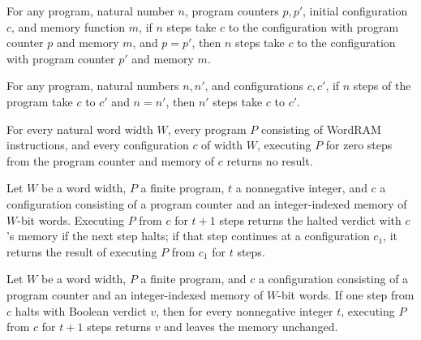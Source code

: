 \begin{theorem}
\label{WordRAM.Steps.cast_pos}
\leanok
{}
For any program, natural number $n$, program counters $p,p'$, initial configuration $c$,
and memory function $m$, if $n$ steps take $c$ to the configuration with program counter
$p$ and memory $m$, and $p=p'$, then $n$ steps take $c$ to the configuration with
program counter $p'$ and memory $m$.
\end{theorem}

\begin{theorem}
\label{WordRAM.Steps.cast_count}
\leanok
{}
For any program, natural numbers $n,n'$, and configurations $c,c'$, if $n$ steps of the
program take $c$ to $c'$ and $n=n'$, then $n'$ steps take $c$ to $c'$.
\end{theorem}

\begin{theorem}
\label{WordRAM.exec_zero}
\leanok
{}
For every natural word width $W$, every program $P$ consisting of WordRAM instructions,
and every configuration $c$ of width $W$, executing $P$ for zero steps from the program
counter and memory of $c$ returns no result.
\end{theorem}

\begin{theorem}
\label{WordRAM.exec_succ}
\leanok
{}
Let $W$ be a word width, $P$ a finite program, $t$ a nonnegative integer, and $c$ a
configuration consisting of a program counter and an integer-indexed memory of $W$-bit
words. Executing $P$ from $c$ for $t+1$ steps returns the halted verdict with $c$'s
memory if the next step halts; if that step continues at a configuration $c_1$, it
returns the result of executing $P$ from $c_1$ for $t$ steps.
\end{theorem}

\begin{theorem}
\label{WordRAM.exec_succ_of_verdict}
\leanok
{}
Let $W$ be a word width, $P$ a finite program, and $c$ a configuration consisting of a
program counter and an integer-indexed memory of $W$-bit words. If one step from $c$
halts with Boolean verdict $v$, then for every nonnegative integer $t$, executing $P$
from $c$ for $t+1$ steps returns $v$ and leaves the memory unchanged.
\end{theorem}

